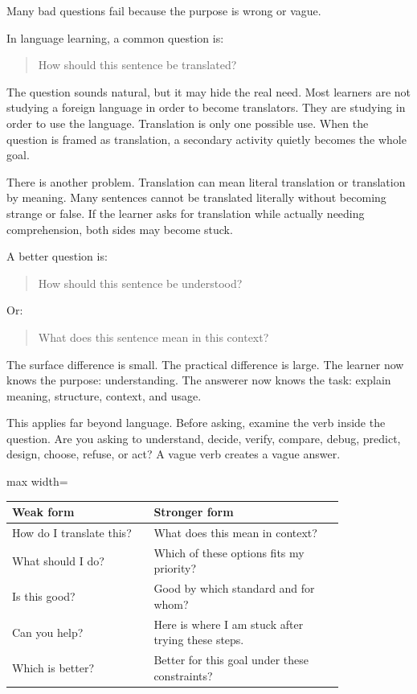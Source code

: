 Many bad questions fail because the purpose is wrong or vague.

In language learning, a common question is:

\begin{quote}
How should this sentence be translated?
\end{quote}

The question sounds natural, but it may hide the real need. Most learners are not studying a foreign language in order to become translators. They are studying in order to use the language. Translation is only one possible use. When the question is framed as translation, a secondary activity quietly becomes the whole goal.

There is another problem. Translation can mean literal translation or translation by meaning. Many sentences cannot be translated literally without becoming strange or false. If the learner asks for translation while actually needing comprehension, both sides may become stuck.

A better question is:

\begin{quote}
How should this sentence be understood?
\end{quote}

Or:

\begin{quote}
What does this sentence mean in this context?
\end{quote}

The surface difference is small. The practical difference is large. The learner now knows the purpose: understanding. The answerer now knows the task: explain meaning, structure, context, and usage.

This applies far beyond language. Before asking, examine the verb inside the question. Are you asking to understand, decide, verify, compare, debug, predict, design, choose, refuse, or act? A vague verb creates a vague answer.

\begin{center}
\begin{adjustbox}{max width=\linewidth}
\begin{tabular}{p{0.35\linewidth}p{0.47\linewidth}}
\hline
Weak form & Stronger form \\
\hline
How do I translate this? & What does this mean in context? \\
What should I do? & Which of these options fits my priority? \\
Is this good? & Good by which standard and for whom? \\
Can you help? & Here is where I am stuck after trying these steps. \\
Which is better? & Better for this goal under these constraints? \\
\hline
\end{tabular}
\end{adjustbox}
\end{center}

